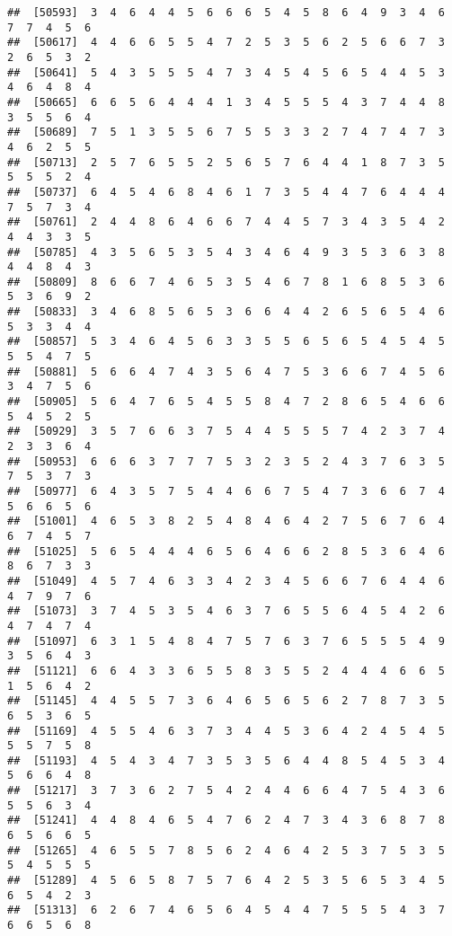 \documentclass[
]{book}
\begin{document}
\begin{verbatim}
##  [50593]  3  4  6  4  4  5  6  6  6  5  4  5  8  6  4  9  3  4  6  7  7  4  5  6
##  [50617]  4  4  6  6  5  5  4  7  2  5  3  5  6  2  5  6  6  7  3  2  6  5  3  2
##  [50641]  5  4  3  5  5  5  4  7  3  4  5  4  5  6  5  4  4  5  3  4  6  4  8  4
##  [50665]  6  6  5  6  4  4  4  1  3  4  5  5  5  4  3  7  4  4  8  3  5  5  6  4
##  [50689]  7  5  1  3  5  5  6  7  5  5  3  3  2  7  4  7  4  7  3  4  6  2  5  5
##  [50713]  2  5  7  6  5  5  2  5  6  5  7  6  4  4  1  8  7  3  5  5  5  5  2  4
##  [50737]  6  4  5  4  6  8  4  6  1  7  3  5  4  4  7  6  4  4  4  7  5  7  3  4
##  [50761]  2  4  4  8  6  4  6  6  7  4  4  5  7  3  4  3  5  4  2  4  4  3  3  5
##  [50785]  4  3  5  6  5  3  5  4  3  4  6  4  9  3  5  3  6  3  8  4  4  8  4  3
##  [50809]  8  6  6  7  4  6  5  3  5  4  6  7  8  1  6  8  5  3  6  5  3  6  9  2
##  [50833]  3  4  6  8  5  6  5  3  6  6  4  4  2  6  5  6  5  4  6  5  3  3  4  4
##  [50857]  5  3  4  6  4  5  6  3  3  5  5  6  5  6  5  4  5  4  5  5  5  4  7  5
##  [50881]  5  6  6  4  7  4  3  5  6  4  7  5  3  6  6  7  4  5  6  3  4  7  5  6
##  [50905]  5  6  4  7  6  5  4  5  5  8  4  7  2  8  6  5  4  6  6  5  4  5  2  5
##  [50929]  3  5  7  6  6  3  7  5  4  4  5  5  5  7  4  2  3  7  4  2  3  3  6  4
##  [50953]  6  6  6  3  7  7  7  5  3  2  3  5  2  4  3  7  6  3  5  7  5  3  7  3
##  [50977]  6  4  3  5  7  5  4  4  6  6  7  5  4  7  3  6  6  7  4  5  6  6  5  6
##  [51001]  4  6  5  3  8  2  5  4  8  4  6  4  2  7  5  6  7  6  4  6  7  4  5  7
##  [51025]  5  6  5  4  4  4  6  5  6  4  6  6  2  8  5  3  6  4  6  8  6  7  3  3
##  [51049]  4  5  7  4  6  3  3  4  2  3  4  5  6  6  7  6  4  4  6  4  7  9  7  6
##  [51073]  3  7  4  5  3  5  4  6  3  7  6  5  5  6  4  5  4  2  6  4  7  4  7  4
##  [51097]  6  3  1  5  4  8  4  7  5  7  6  3  7  6  5  5  5  4  9  3  5  6  4  3
##  [51121]  6  6  4  3  3  6  5  5  8  3  5  5  2  4  4  4  6  6  5  1  5  6  4  2
##  [51145]  4  4  5  5  7  3  6  4  6  5  6  5  6  2  7  8  7  3  5  6  5  3  6  5
##  [51169]  4  5  5  4  6  3  7  3  4  4  5  3  6  4  2  4  5  4  5  5  5  7  5  8
##  [51193]  4  5  4  3  4  7  3  5  3  5  6  4  4  8  5  4  5  3  4  5  6  6  4  8
##  [51217]  3  7  3  6  2  7  5  4  2  4  4  6  6  4  7  5  4  3  6  5  5  6  3  4
##  [51241]  4  4  8  4  6  5  4  7  6  2  4  7  3  4  3  6  8  7  8  6  5  6  6  5
##  [51265]  4  6  5  5  7  8  5  6  2  4  6  4  2  5  3  7  5  3  5  5  4  5  5  5
##  [51289]  4  5  6  5  8  7  5  7  6  4  2  5  3  5  6  5  3  4  5  6  5  4  2  3
##  [51313]  6  2  6  7  4  6  5  6  4  5  4  4  7  5  5  5  4  3  7  6  6  5  6  8

\end{verbatim}
\end{document}
